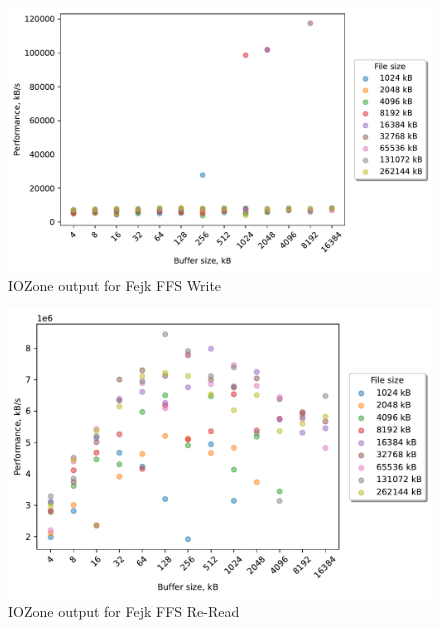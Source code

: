 \begin{figure}[!htb]
	\label{fig:bench_fffs_write}
	\begin{center}
		\includegraphics[width=1.0\textwidth]{figures/benchmarking/fejk-ffs/Write.pdf}
	\end{center}
	\caption{IOZone output for Fejk FFS Write}
\end{figure}

\begin{figure}[!htb]
	\label{fig:bench_fffs_re_read}
	\begin{center}
		\includegraphics[width=1.0\textwidth]{figures/benchmarking/fejk-ffs/Re-Read.pdf}
	\end{center}
	\caption{IOZone output for Fejk FFS \mbox{Re-Read}}
\end{figure}

